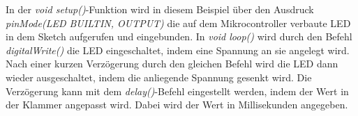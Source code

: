 In der \textit{void setup()}-Funktion wird in diesem Beispiel über den Ausdruck \textit{pinMode(LED BUILTIN, OUTPUT)} die auf dem Mikrocontroller verbaute LED in dem Sketch aufgerufen und eingebunden.
In \textit{void loop()} wird durch den Befehl\textit{ digitalWrite()} die LED eingeschaltet, indem eine Spannung an sie angelegt wird. Nach einer kurzen Verzögerung durch den gleichen Befehl wird die LED dann wieder ausgeschaltet, indem die anliegende Spannung gesenkt wird. Die Verzögerung kann mit dem \textit{delay()}-Befehl eingestellt werden, indem der Wert in der Klammer angepasst wird. Dabei wird der Wert in Millisekunden angegeben.
